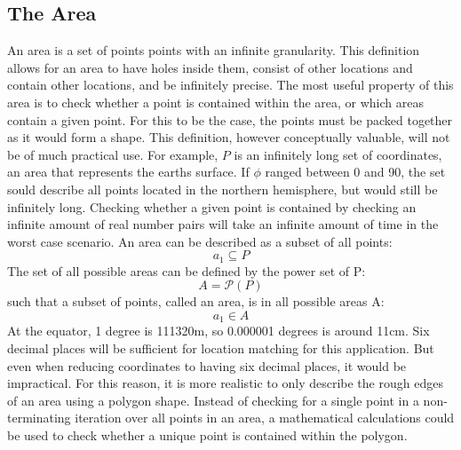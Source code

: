 \subsection{The Area}
An area is a set of points points with an infinite granularity. This definition allows for an area to have holes inside them, consist of other locations and contain other locations, and be infinitely precise. The most useful property of this area is to check whether a point is contained within the area, or which areas contain a given point. For this to be the case, the points must be packed together as it would form a shape. This definition, however conceptually valuable, will not be of much practical use. For example, $P$ is an infinitely long set of coordinates, an area that represents the earths surface. If $\phi$ ranged between 0 and 90, the set sould describe all points located in the northern hemisphere, but would still be infinitely long. Checking whether a given point is contained by checking an infinite amount of real number pairs will take an infinite amount of time in the worst case scenario. An area can be described as a subset of all points:
\[a_1 \subseteq P \]
The set of all possible areas can be defined by the power set of P:
\[A = \mathcal{P}(P)\]
such that a subset of points, called an area, is in all possible areas A:
\[a_1 \in A\]
At the equator, 1 degree is 111320m, so 0.000001 degrees is
around 11cm. Six decimal places will be sufficient for location matching for this application. But even when reducing coordinates to having six decimal places, it would be impractical. For this reason, it is more realistic to only describe the rough edges of an area using a polygon shape. Instead of checking for a single point in a non-terminating iteration over all points in an area, a mathematical calculations could be used to check whether a unique point is contained within the polygon.

